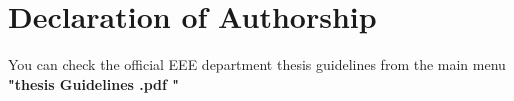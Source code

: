\chapter*{Declaration of Authorship}


You can check the official EEE department thesis guidelines from the main menu \textbf{"thesis Guidelines .pdf "}